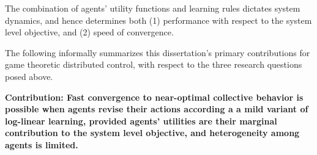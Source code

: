 The combination of agents' utility functions and learning rules dictates system dynamics, and hence determines both (1) performance with respect to the system level objective, and (2) speed of convergence. 




The following informally summarizes this dissertation's primary contributions for game theoretic distributed control, with respect to the three research questions posed above.


\smallskip

\noindent \textbf{Contribution: Fast convergence to near-optimal collective behavior is possible when agents revise their actions according a a mild variant of log-linear learning, provided agents' utilities are their marginal contribution to the system level objective, and heterogeneity among agents is limited.}



